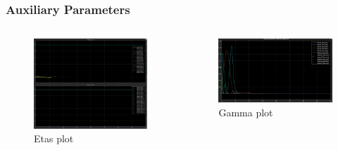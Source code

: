 \documentclass{beamer}
\begin{document}
\begin{frame}
    \frametitle{Auxiliary Parameters}

    \begin{columns}

        \begin{figure}[h]
            \centering
            \includegraphics[width=1\textwidth]{Etas.png}
            \caption{Etas plot}
            \label{fig:etas}
        \end{figure}

        \begin{figure}[h]
            \centering
            \includegraphics[width=1\textwidth]{Gamma.png}
            \caption{Gamma plot}
            \label{fig:gamma}
        \end{figure}
    \end{columns}
\end{frame}
\end{document}
